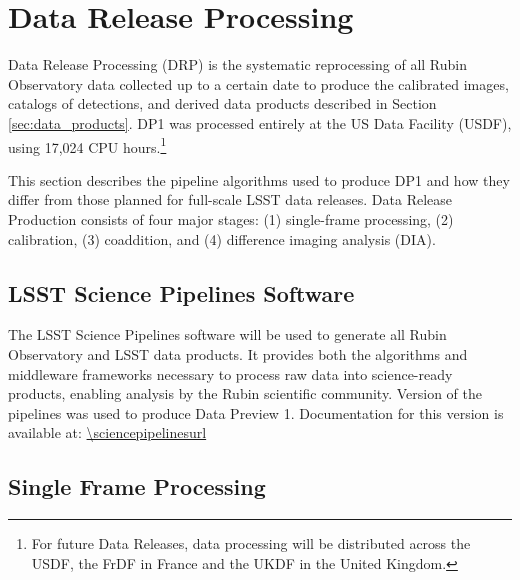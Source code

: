 \section{Data Release Processing}
\label{sec:drp}

Data Release Processing (DRP) is the systematic reprocessing of all Rubin Observatory data collected up to a certain date to produce the calibrated images, catalogs of detections, and derived data products described in Section \ref{sec:data_products}.
DP1 was processed entirely at the US Data Facility (USDF), using 17,024 CPU hours.\footnote{For future Data Releases, data processing will be distributed across the USDF, the FrDF in France and the UKDF in the United Kingdom.}

This section describes the pipeline algorithms used to produce DP1 and how they differ from those planned for full-scale LSST data releases. 
Data Release Production consists of four major stages: (1) single-frame processing, (2) calibration, (3) coaddition, and (4) difference imaging analysis (DIA).

\subsection{LSST Science Pipelines Software}
\label{ssec:pipelines}
The LSST Science Pipelines software \citep{PSTN-019, LDM-151} will be used to generate all Rubin Observatory and LSST data products. 
It provides both the algorithms and middleware frameworks necessary to process raw data into science-ready products, enabling analysis by the Rubin scientific community.
Version \sciencepipelinesversion of the pipelines was used to produce Data Preview 1. 
Documentation for this version is available at: \url{\sciencepipelinesurl}

\subsection{Single Frame Processing
\label{ssec:single_frame_processing}}



